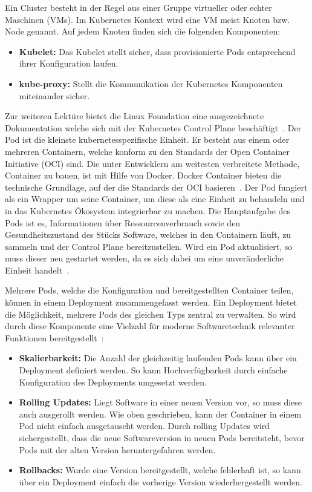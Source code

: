 Ein Cluster besteht in der Regel aus einer Gruppe virtueller oder echter Maschinen (VMs).
Im Kubernetes Kontext wird eine VM meist Knoten bzw. Node genannt.
Auf jedem Knoten finden sich die folgenden Komponenten:

\begin{itemize}
    \item \textbf{Kubelet:} Das Kubelet stellt sicher, dass provisionierte Pods entsprechend ihrer Konfiguration laufen.
    \item \textbf{kube-proxy:} Stellt die Kommunikation der Kubernetes Komponenten miteinander sicher.
\end{itemize}
Zur weiteren Lektüre bietet die Linux Foundation eine ausgezeichnete Dokumentation welche sich mit der Kubernetes Control Plane beschäftigt~\cite{kubernetescomponents}.
Der Pod ist die kleinste kubernetesspezifische Einheit.
Er besteht aus einem oder mehreren Containern, welche konform zu den Standards der Open Container Initiative (OCI) sind.
Die unter Entwicklern am weitesten verbreitete Methode, Container zu bauen, ist mit Hilfe von Docker.
Docker Container bieten die technische Grundlage, auf der die Standards der OCI basieren~\cite{opencontainerinitiative}.
Der Pod fungiert als ein Wrapper um seine Container, um diese als eine Einheit zu behandeln und in das Kubernetes Ökosystem integrierbar zu machen.
Die Hauptaufgabe des Pods ist es, Informationen über Ressourcenverbrauch sowie den Gesundheitszustand des Stücks Software, welches in den Containern läuft, zu sammeln und der Control Plane bereitzustellen.
Wird ein Pod aktualisiert, so muss dieser neu gestartet werden, da es sich dabei um eine unveränderliche Einheit handelt~\cite{kubernetespods}.

Mehrere Pods, welche die Konfiguration und bereitgestellten Container teilen, können in einem Deployment zusammengefasst werden.
Ein Deployment bietet die Möglichkeit, mehrere Pods des gleichen Typs zentral zu verwalten.
So wird durch diese Komponente eine Vielzahl für moderne Softwaretechnik relevanter Funktionen bereitgestellt~\cite{kubernetesdeployments}:

\begin{itemize}
    \item \textbf{Skalierbarkeit:} Die Anzahl der gleichzeitig laufenden Pods kann über ein Deployment definiert werden.
    So kann Hochverfügbarkeit durch einfache Konfiguration des Deployments umgesetzt werden.
    \item \textbf{Rolling Updates:} Liegt Software in einer neuen Version vor, so muss diese auch ausgerollt werden.
    Wie oben geschrieben, kann der Container in einem Pod nicht einfach ausgetauscht werden.
    Durch rolling Updates wird sichergestellt, dass die neue Softwareversion in neuen Pods bereitsteht, bevor Pods mit der alten Version heruntergefahren werden.
    \item \textbf{Rollbacks:} Wurde eine Version bereitgestellt, welche fehlerhaft ist, so kann über ein Deployment einfach die vorherige Version wiederhergestellt werden.
\end{itemize}~\cite{kubernetesdeployments}

